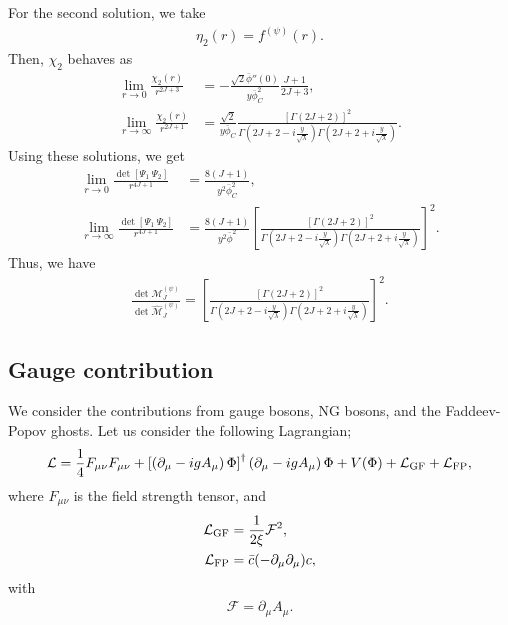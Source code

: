 \documentclass[12pt]{article}
\begin{document}
For the second solution, we take
\begin{align}
 \eta_2(r) = f^{(\psi)}(r).
\end{align}
Then, $\chi_2$ behaves as
\begin{align}
 \lim_{r\to0}\frac{\chi_2(r)}{r^{2J+3}}
  & = -\frac{\sqrt{2}\bar\phi''(0)}{y\bar\phi_C^2}\frac{J+1}{2J+3}, \\
 \lim_{r\to\infty}\frac{\chi_2(r)}{r^{2J+1}}
  & = \frac{\sqrt{2}}{y\bar\phi_C}
 \frac{[\Gamma(2J+2)]^2}{\Gamma
  \left(
   2J+2-i\frac{y}{\sqrt{\lambda}}
  \right)\Gamma
  \left(
   2J+2+i\frac{y}{\sqrt{\lambda}}
  \right)}.
\end{align}
Using these solutions, we get
\begin{align}
 \lim_{r\to0}\frac{\det[\Psi_1~\Psi_2]}{r^{4J+1}}
  & = \frac{8(J+1)}{y^2\bar\phi_C^2}, \\
 \lim_{r\to\infty}\frac{\det[\Psi_1~\Psi_2]}{r^{4J+1}}
  & = \frac{8(J+1)}{y^2\bar\phi^2}
 \left[
  \frac{[\Gamma(2J+2)]^2}{\Gamma
   \left(
    2J+2-i\frac{y}{\sqrt{\lambda}}
   \right)\Gamma
   \left(
    2J+2+i\frac{y}{\sqrt{\lambda}}
   \right)}
 \right]^2.
\end{align}
Thus, we have
\begin{align}
 \frac{\det\mathcal M^{(\psi)}_J}{\det\widehat{\mathcal M}^{(\psi)}_J}
 =
 \left[
  \frac{[\Gamma(2J+2)]^2}{\Gamma
   \left(
    2J+2-i\frac{y}{\sqrt{\lambda}}
   \right)\Gamma
   \left(
    2J+2+i\frac{y}{\sqrt{\lambda}}
   \right)}
 \right]^2.
 \label{eq_FermionDeterminant}
\end{align}

\subsection{Gauge contribution}

We consider the contributions from gauge bosons, NG bosons, and the
Faddeev-Popov ghosts.  Let us consider the following Lagrangian;
\begin{align}
  \mathcal L = \frac{1}{4} F_{\mu\nu} F_{\mu\nu}
  + \left[
    \left(
      \partial_\mu - i g A_\mu 
    \right) \Phi
  \right]^\dagger
  \left(
    \partial_\mu - i g A_\mu 
  \right) \Phi
  +V(\Phi)+\mathcal L_{\rm GF}+\mathcal L_{\rm FP},
\end{align}
where $F_{\mu\nu}$ is the field strength tensor, and
\begin{align}
  \mathcal L_{\rm GF} & = \frac{1}{2\xi}\mathcal F^2, \\
  \mathcal L_{\rm FP} & = \bar{c}(-\partial_\mu \partial_\mu)c,
\end{align}
with
\begin{align}
  \mathcal F = \partial_\mu A_\mu.
\end{align}
\end{document}
